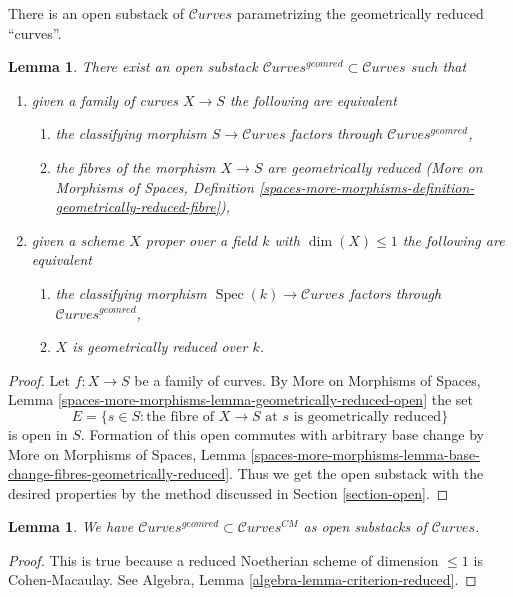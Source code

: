 \documentclass{stacks-project}
\theoremstyle{plain}
\newtheorem{lemma}[subsection]{Lemma}
\theoremstyle{definition}
\theoremstyle{remark}
\numberwithin{equation}{subsection}
\def\Spec{\mathop{\mathrm{Spec}}}
\def\Curvesstack{\mathcal{C}\!\mathit{urves}}
\begin{document}
\noindent
There is an open substack of $\Curvesstack$ parametrizing
the geometrically reduced ``curves''.

\begin{lemma}
\label{lemma-geometrically-reduced-curves}
There exist an open substack $\Curvesstack^{geomred} \subset \Curvesstack$
such that
\begin{enumerate}
\item given a family of curves $X \to S$ the following are equivalent
\begin{enumerate}
\item the classifying morphism $S \to \Curvesstack$ factors
through $\Curvesstack^{geomred}$,
\item the fibres of the morphism $X \to S$ are geometrically reduced
(More on Morphisms of Spaces, Definition
\ref{spaces-more-morphisms-definition-geometrically-reduced-fibre}),
\end{enumerate}
\item given a scheme $X$ proper over a field $k$ with $\dim(X) \leq 1$
the following are equivalent
\begin{enumerate}
\item the classifying morphism $\Spec(k) \to \Curvesstack$ factors
through $\Curvesstack^{geomred}$,
\item $X$ is geometrically reduced over $k$.
\end{enumerate}
\end{enumerate}
\end{lemma}

\begin{proof}
Let $f : X \to S$ be a family of curves. By
More on Morphisms of Spaces, Lemma
\ref{spaces-more-morphisms-lemma-geometrically-reduced-open}
the set
$$
E = \{s \in S : \text{the fibre of }X \to S\text{ at }s
\text{ is geometrically reduced}\}
$$
is open in $S$. Formation of this open commutes with arbitrary
base change by
More on Morphisms of Spaces, Lemma
\ref{spaces-more-morphisms-lemma-base-change-fibres-geometrically-reduced}.
Thus we get the open substack with the desired properties
by the method discussed in Section \ref{section-open}.
\end{proof}

\begin{lemma}
\label{lemma-geomred-in-CM}
We have $\Curvesstack^{geomred} \subset \Curvesstack^{CM}$
as open substacks of $\Curvesstack$.
\end{lemma}

\begin{proof}
This is true because a reduced Noetherian scheme of
dimension $\leq 1$ is Cohen-Macaulay. See
Algebra, Lemma \ref{algebra-lemma-criterion-reduced}.
\end{proof}
\end{document}
